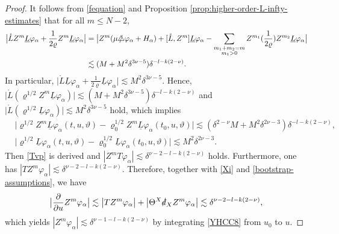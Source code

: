 \documentclass[11pt,twoside]{article}
\def\al{\alpha}
\def\vp{\varphi}
\begin{document}
\begin{proof}
It follows from \eqref{fequation} and Proposition \ref{prop:higher-order-L-infty-estimates} that for all $m \leq N-2$,
\begin{equation*}
\begin{split}
\big| \mathring{L}{Z}^m \underline{L} \vp_\al + \frac{1}{2\varrho}{Z}^m \underline{L} \vp_\al \big|
&= \big|{Z}^m (\mu\slashed\triangle\vp_\al+H_\al )+ [\mathring{L}, {Z}^m] \underline{L} \vp_\al
- \sum_{\substack{m_1 + m_2 =m \\ m_1 > 0}}{Z}^{m_1}(\frac{1}{2\varrho}){Z}^{m_2} \underline{L} \vp_\al\big| \\
&\lesssim (M+M^2\delta^{3\nu-5})\delta^{-l-k(2-\nu)}.
\end{split}
\end{equation*}
In particular, $\big| \mathring{L}\underline{L} \vp_\al + \frac{1}{2\varrho}\underline{L} \vp_\al \big|\lesssim M^2\delta^{3\nu-5}.$
Hence,
$\big| \mathring{L} \left( \varrho^{1/2}{Z}^m \underline{L} \vp_\al \right)\big|
\lesssim (M+M^2\delta^{3\nu-5}) \delta^{-l-k(2-\nu)}$ and $\big|\mathring L\left( \varrho^{1/2}\underline{L} \vp_\al \right)\big|\lesssim M^2\delta^{3\nu-5}$ hold,
which implies
\begin{equation*}
\begin{split}
&\big| \varrho^{1/2} {Z}^m \underline{L} \vp_\al(t,u,\vartheta)-\varrho_0^{1/2}{Z}^m \underline{L} \vp_\al(t_0,u,\vartheta)\big|
\lesssim (\delta^{2-\nu}M+M^2\delta^{2\nu-3}) \delta^{-l-k(2-\nu)},\\
&\big| \varrho^{1/2}\underline{L} \vp_\al(t,u,\vartheta)-\varrho_0^{1/2}\underline{L} \vp_\al(t_0,u,\vartheta)\big|
\lesssim M^2\delta^{2\nu-3}.
\end{split}
\end{equation*}
Then \eqref{Tvp} is derived and $|{Z}^m T \vp_\al| \lesssim \delta^{\nu-2-l-k(2-\nu)}$ holds. Furthermore, one has
$|T Z^m\vp_\al|\lesssim \delta^{\nu-2-l-k(2-\nu)}$.
Therefore, together with \eqref{Xi} and \eqref{bootstrap-assumptions}, we have
\begin{equation}\label{YHCC8}
\big| \frac{\partial}{\partial u}{Z}^m \vp_\al\big|
\lesssim \big|T{Z}^m \vp_\al\big| + \big| \Theta^X \slashed{d}_X {Z}^m \vp_\al \big|
\lesssim \delta^{\nu-2-l-k(2-\nu)},
\end{equation}
which yields $|{Z}^m \vp_\al| \lesssim \delta^{\nu-1-l-k(2-\nu)}$ by integrating \eqref{YHCC8} from $u_0$ to $u$.
\end{proof}
\end{document}

